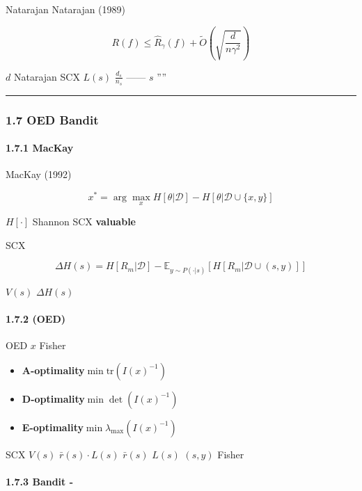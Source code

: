 \documentclass[
  12pt,
]{article}
\providecommand{\tightlist}{%
  \setlength{\itemsep}{0pt}\setlength{\parskip}{0pt}}
\begin{document}
 Natarajan
Natarajan (1989) 

\[R(f) \leq \hat{R}_\gamma(f) + \tilde{O}\left(\sqrt{\frac{d}{n\gamma^2}}\right)\]

 \(d\)  Natarajan SCX  \(L(s)\) 
\(\frac{d_s}{n_s}\) ------ \(s\) ''''

\begin{center}\rule{0.5\linewidth}{0.5pt}\end{center}

\subsubsection{1.7 OED
Bandit}\label{ux4e3bux52a8ux91c7ux6837oedux4fe1ux606fux8bbaux4e0e-bandit}

\paragraph{1.7.1 MacKay
}\label{mackay-ux4fe1ux606fux8bbaux4e3bux52a8ux5b66ux4e60}

MacKay (1992) 

\[x^* = \arg\max_x H[\theta | \mathcal{D}] - H[\theta | \mathcal{D} \cup \{x, y\}]\]

 \(H[\cdot]\)  Shannon  SCX
\textbf{valuable} 

SCX 

\[\Delta H(s) = H[R_m | \mathcal{D}] - \mathbb{E}_{y \sim P(\cdot|s)}[H[R_m | \mathcal{D} \cup (s, y)]]\]

\(V(s)\)  \(\Delta H(s)\) 

\paragraph{1.7.2 
(OED)}\label{ux6700ux4f18ux5b9eux9a8cux8bbeux8ba1-oed}

 OED  \(x\)  Fisher


\begin{itemize}
\tightlist
\item
  \textbf{A-optimality}\(\min \text{tr}(I(x)^{-1})\)
\item
  \textbf{D-optimality}\(\min \det(I(x)^{-1})\)
\item
  \textbf{E-optimality}\(\min \lambda_{\max}(I(x)^{-1})\)
\end{itemize}

SCX  \(V(s)\)  \(\bar{r}(s) \cdot L(s)\)
\textbf{} \(\bar{r}(s)\)
 \(L(s)\)  \((s, y)\)  Fisher 

\paragraph{1.7.3 Bandit
-}\label{bandit-ux89c6ux89d2ux63a2ux7d22-ux5229ux7528ux6743ux8861}
\end{document}
